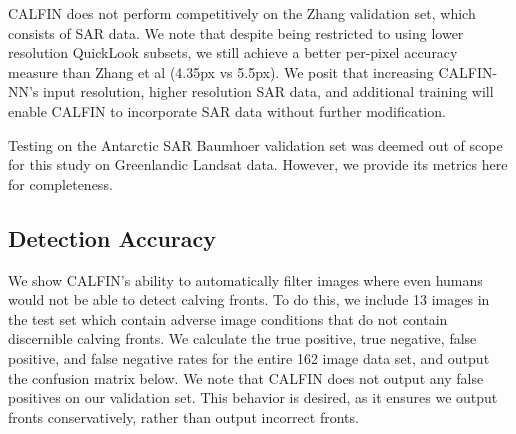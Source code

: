 \documentclass[tc, manuscript]{copernicus}
\begin{document}
CALFIN does not perform competitively on the Zhang validation set, which consists of SAR data. We note that despite being restricted to using lower resolution QuickLook subsets, we still achieve a better per-pixel accuracy measure than Zhang et al (4.35px vs 5.5px). We posit that increasing CALFIN-NN's input resolution, higher resolution SAR data, and additional training will enable CALFIN to incorporate SAR data without further modification. 

Testing on the Antarctic SAR Baumhoer validation set was deemed out of scope for this study on Greenlandic Landsat data. However, we provide its metrics here for completeness.

\begin{table}[h]
\caption{Error estimate and classification accuracy for all available combinations of model-validation sets. }
\centering
{}
\label{Error}
\end{table}

\subsection{Detection Accuracy}
We show CALFIN's ability to automatically filter images where even humans would not be able to detect calving fronts. To do this, we include 13 images in the test set which contain adverse image conditions that do not contain discernible calving fronts. We calculate the true positive, true negative, false positive, and false negative rates for the entire 162 image data set, and output the confusion matrix below. We note that CALFIN does not output any false positives on our validation set. This behavior is desired, as it ensures we output fronts conservatively, rather than output incorrect fronts.
\end{document}
